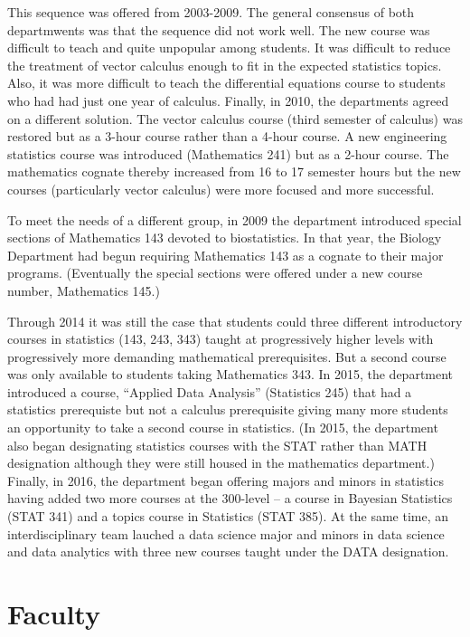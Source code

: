 \documentclass[
]{book}
\begin{document}
This sequence was offered from 2003-2009. The general consensus of both departmwents was that the sequence did not work well. The new course was difficult to teach and quite unpopular among students. It was difficult to reduce the treatment of vector calculus enough to fit in the expected statistics topics. Also, it was more difficult to teach the differential equations course to students who had had just one year of calculus. Finally, in 2010, the departments agreed on a different solution. The vector calculus course (third semester of calculus) was restored but as a 3-hour course rather than a 4-hour course. A new engineering statistics course was introduced (Mathematics 241) but as a 2-hour course. The mathematics cognate thereby increased from 16 to 17 semester hours but the new courses (particularly vector calculus) were more focused and more successful.

To meet the needs of a different group, in 2009 the department introduced special sections of Mathematics 143 devoted to biostatistics. In that year, the Biology Department had begun requiring Mathematics 143 as a cognate to their major programs. (Eventually the special sections were offered under a new course number, Mathematics 145.)

Through 2014 it was still the case that students could three different introductory courses in statistics (143, 243, 343) taught at progressively higher levels with progressively more demanding mathematical prerequisites. But a second course was only available to students taking Mathematics 343. In 2015, the department introduced a course, ``Applied Data Analysis'' (Statistics 245) that had a statistics prerequiste but not a calculus prerequisite giving many more students an opportunity to take a second course in statistics. (In 2015, the department also began designating statistics courses with the STAT rather than MATH designation although they were still housed in the mathematics department.) Finally, in 2016, the department began offering majors and minors in statistics having added two more courses at the 300-level -- a course in Bayesian Statistics (STAT 341) and a topics course in Statistics (STAT 385). At the same time, an interdisciplinary team lauched a data science major and minors in data science and data analytics with three new courses taught under the DATA designation.

\hypertarget{faculty}{%
\section{Faculty}\label{faculty}}
\end{document}

